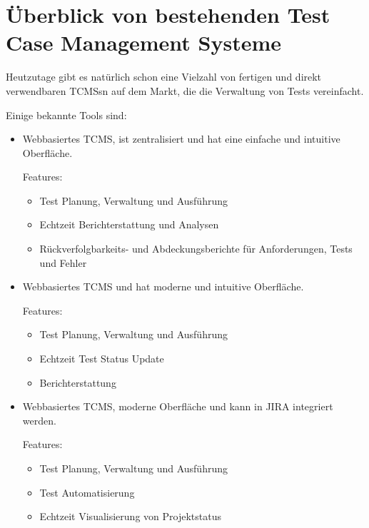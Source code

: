 \documentclass[a4paper, fontsize=11pt, parskip=half, twoside]{scrreprt}
\begin{document}
	\section{Überblick von bestehenden Test Case Management Systeme}
	Heutzutage gibt es natürlich schon eine Vielzahl von fertigen und direkt verwendbaren \aclp{TCMS}n auf dem Markt, die die Verwaltung von Tests vereinfacht.
	
	Einige bekannte Tools sind:
	
	\begin{itemize}
		\item \textcite{noauthor_testrail_2023} 
		
		Webbasiertes \acl{TCMS}, ist zentralisiert und hat eine einfache und intuitive Oberfläche.
		
		Features:
		\begin{itemize}
			\setlength\itemsep{-0.5em}
			\item Test Planung, Verwaltung und Ausführung 
			\item Echtzeit Berichterstattung und Analysen
			\item Rückverfolgbarkeits- und Abdeckungsberichte für Anforderungen, Tests und Fehler
		\end{itemize}
		
		\item \textcite{noauthor_tricentis_nodate} 
		
		Webbasiertes \acl{TCMS} und hat moderne und intuitive Oberfläche.
		
		Features:
		\begin{itemize}
			\setlength\itemsep{-0.5em}
			\item Test Planung, Verwaltung und Ausführung 
			\item Echtzeit Test Status Update
			\item Berichterstattung
		\end{itemize}
		
		\item \textcite{noauthor_zephyr_nodate} 
		
		Webbasiertes \acl{TCMS}, moderne Oberfläche und kann in JIRA integriert werden. 
		
		Features:
		\begin{itemize}
			\setlength\itemsep{-0.5em}
			\item Test Planung, Verwaltung und Ausführung 
			\item Test Automatisierung
			\item Echtzeit Visualisierung von Projektstatus
		\end{itemize}
		

\end{itemize}
\end{document}
